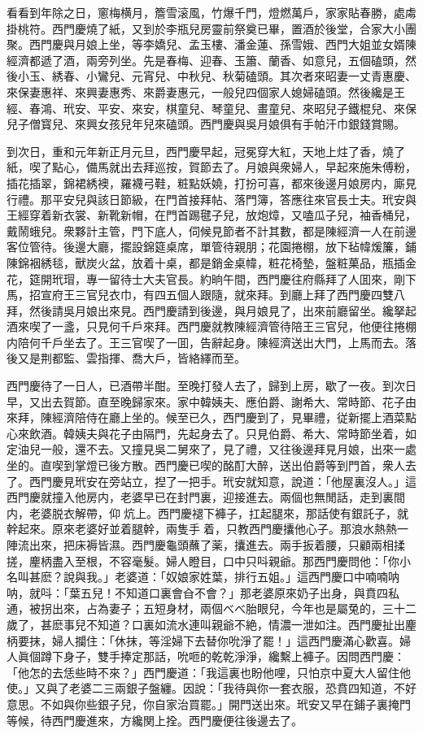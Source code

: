 看看到年除之日，窻梅横月，簷雪滚風，竹爆千門，燈燃萬戶，家家貼春勝，處䖏掛桃符。西門慶燒了紙，又到於李瓶兒房靈前祭奠已畢，置酒於後堂，合家大小團聚。西門慶與月娘上坐，等李嬌兒、孟玉樓、潘金蓮、孫雪娥、西門大姐並女婿陳經濟都遞了酒，兩旁列坐。先是春梅、迎春、玉簫、蘭香、如意兒，五個磕頭，然後小玉、綉春、小鸞兒、元宵兒、中秋兒、秋菊磕頭。其次者來昭妻一丈青惠慶、來保妻惠祥、來興妻惠秀、來爵妻惠元，一般兒四個家人媳婦磕頭。然後纔是王經、春鴻、玳安、平安、來安，棋童兒、琴童兒、畫童兒、來昭兒子鐵棍兒、來保兒子僧寳兒、來興女孩兒年兒來磕頭。西門慶與吳月娘俱有手帕汗巾銀錢賞賜。

到次日，重和元年新正月元旦，西門慶早起，冠冕穿大紅，天地上炷了香，燒了紙，喫了點心，備馬就出去拜巡按，賀節去了。月娘與衆婦人，早起來施朱傅粉，插花插翠，錦裙綉襖，羅襪弓鞋，粧點妖嬈，打扮可喜，都來後邊月娘房内，廝見行禮。那平安兒與該日節級，在門首接拜帖、落門簿，答應往來官長士夫。玳安與王經穿着新衣裳、新靴新帽，在門首踢毽子兒，放炮𤍤，又嗑瓜子兒，袖香桶兒，戴鬧蛾兒。衆夥計主管，門下底人，伺候見節者不計其數，都是陳經濟一人在前邊客位管待。後邊大廳，擺設錦筵桌席，單管待親朋；花園捲棚，放下毡幃煖簾，鋪陳錦裀綉毯，獸炭火盆，放着十桌，都是銷金桌幃，粧花椅墊，盤粧菓品，瓶插金花，筵開玳瑁，專一留待士大夫官長。約晌午間，西門慶往府縣拜了人囬來，剛下馬，招宣府王三官兒衣巾，有四五個人跟隨，就來拜。到廳上拜了西門慶四雙八拜，然後請吳月娘出來見。西門慶請到後邊，與月娘見了，出來前廳留坐。纔拏起酒來喫了一盞，只見何千戶來拜。西門慶就教陳經濟管待陪王三官兒，他便往捲棚内陪何千戶坐去了。王三官喫了一囬，告辭起身。陳經濟送出大門，上馬而去。落後又是荆都監、雲指揮、喬大戶，皆絡繹而至。

西門慶待了一日人，已酒帶半酣。至晚打發人去了，歸到上房，歇了一夜。到次日早，又出去賀節。直至晚歸家來。家中韓姨夫、應伯爵、謝希大、常時節、花子由來拜，陳經濟陪侍在廳上坐的。候至已久，西門慶到了，見畢禮，従新擺上酒菜點心來飲酒。韓姨夫與花子由隔門，先起身去了。只見伯爵、希大、常時節坐着，如定油兒一般，還不去。又撞見吳二舅來了，見了禮，又往後邊拜見月娘，出來一處坐的。直喫到掌燈已後方散。西門慶已喫的酩酊大醉，送出伯爵等到門首，衆人去了。西門慶見玳安在旁站立，揑了一把手。玳安就知意，說道：「他屋裏沒人。」這西門慶就撞入他房内，老婆早已在封門裏，迎接進去。兩個也無閒話，走到裏間内，老婆脱衣解帶，仰𢵞炕上。西門慶褪下褲子，扛起腿來，那話使有銀託子，就幹起來。原來老婆好並着腿幹，兩隻手𢵞着，只教西門慶攮他心子。那浪水熱熱一陣流出來，把床褥皆濕。西門慶龜頭蘸了薬，攮進去。兩手扳着腰，只顧兩相揉搓，麈柄盡入至根，不容毫髮。婦人瞪目，口中只呌親爺。那西門慶問他：「你小名叫甚麽？說與我。」老婆道：「奴娘家姓葉，排行五姐。」這西門慶口中喃喃呐呐，就呌：「葉五兒！不知道口裏會㒲不會？」那老婆原來奶子出身，與賁四私通，被拐出來，占為妻子；五短身材，兩個べべ胎眼兒，今年也是屬兔的，三十二歲了，甚麽事兒不知道？口裏如流水連叫親爺不絶，情濃一泄如注。西門慶扯出麈柄要抹，婦人攔住：「休抹，等淫婦下去替你吮淨了罷！」這西門慶滿心歡喜。婦人眞個蹲下身子，雙手捧定那話，吮咂的乾乾淨淨，纔繫上褲子。因問西門慶：「他怎的去恁些時不來？」西門慶道：「我這裏也盼他哩，只怕京中夏大人留住他使。」又與了老婆二三兩銀子盤纏。因說：「我待與你一套衣服，恐賁四知道，不好意思。不如與你些銀子兒，你自家治買罷。」開門送出來。玳安又早在鋪子裏掩門等候，待西門慶進來，方纔関上拴。西門慶便往後邊去了。

